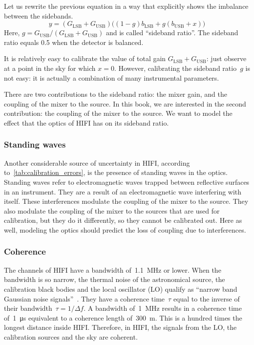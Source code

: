 Let us rewrite the previous equation in a way that explicitly shows the imbalance between the sidebands.
\begin{equation}
    y =
    (G_\text{LSB} + G_\text{USB})
    \bigg( (1-g) b_\text{LSB} + g (b_\text{USB} + x) \bigg)
    \label{eq:explain_sbr_1}
\end{equation}
Here, $g = G_\text{USB}/(G_\text{LSB} + G_\text{USB})$ and is called ``sideband ratio''.
The sideband ratio equals 0.5 when the detector is balanced.

It is relatively easy to calibrate the value of total gain $G_\text{LSB} + G_\text{USB}$:
just observe at a point in the sky for which $x=0$.
However, calibrating the sideband ratio~$g$ is not easy: it is actually a combination of many instrumental parameters.

There are two contributions to the sideband ratio: the mixer gain, and the coupling of the mixer to the source.
In this book, we are interested in the second contribution: the coupling of the mixer to the source.
We want to model the effect that the optics of HIFI has on its sideband ratio. 

\subsubsection{Standing waves}
Another considerable source of uncertainty in HIFI, according to~\cref{tab:calibration_errors}, is the presence of standing waves in the optics.
Standing waves refer to electromagnetic waves trapped between reflective surfaces in an instrument.
They are a result of an electromagnetic wave interfering with itself.
These interferences modulate the coupling of the mixer to the source.
They also modulate the coupling of the mixer to the sources that are used for calibration, but they do it differently, so they cannot be calibrated out.
Here as well, modeling the optics should predict the loss of coupling due to interferences.

\subsubsection{Coherence}
The channels of HIFI have a bandwidth of~\SI{1.1}{\mega\hertz} or lower.
When the bandwidth is so narrow, the thermal noise of the astronomical source, the calibration black bodies and the local oscillator (LO) qualify as ``narrow band Gaussian noise signals''~\cite{siegman1986lasers}.
They have a coherence time~$\tau$ equal to the inverse of their bandwidth~$\tau=1/\Delta f$.
A bandwidth of~\SI{1}{\mega\hertz} results in a coherence time of~\SI{1}{\micro\second} equivalent to a coherence length of~\SI{300}{\meter}.
This is a hundred times the longest distance inside HIFI.
Therefore, in HIFI, the signals from the LO, the calibration sources and the sky are coherent.

